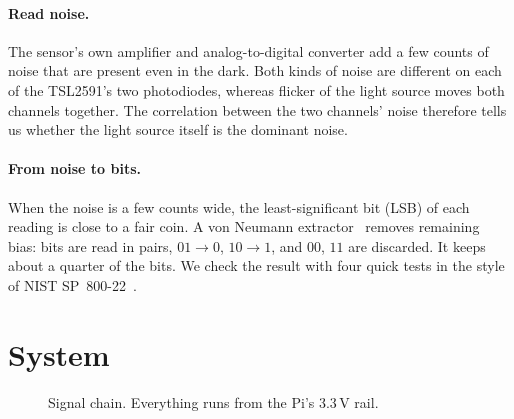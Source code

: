 \documentclass[11pt]{article}
\begin{document}
\paragraph{Read noise.} The sensor's own amplifier and analog-to-digital converter add a few counts of noise
that are present even in the dark. Both kinds of noise are different on each of the TSL2591's two
photodiodes, whereas flicker of the light source moves both channels together. The correlation between the
two channels' noise therefore tells us whether the light source itself is the dominant noise.

\paragraph{From noise to bits.} When the noise is a few counts wide, the least-significant bit (LSB) of each
reading is close to a fair coin. A von Neumann extractor~\cite{vonneumann} removes remaining bias: bits are
read in pairs, $01\!\to\!0$, $10\!\to\!1$, and $00$, $11$ are discarded. It keeps about a quarter of the
bits. We check the result with four quick tests in the style of NIST SP~800-22~\cite{nist}.

\section{System}
\begin{figure}[h]
\centering
{}
\caption{Signal chain. Everything runs from the Pi's 3.3\,V rail.}
\end{figure}
\end{document}
